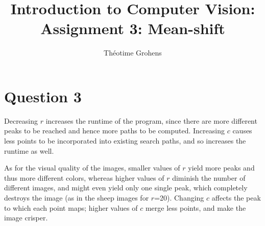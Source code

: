 \documentclass[a4paper]{article}
\author{Théotime Grohens}
\title{Introduction to Computer Vision: \\ Assignment 3: Mean-shift}
\begin{document}
\maketitle

\section*{Question 3}

Decreasing $r$ increases the runtime of the program, since there are more different peaks to be reached and hence more paths to be computed.
Increasing $c$ causes less points to be incorporated into existing search paths, and so increases the runtime as well.

As for the visual quality of the images, smaller values of $r$ yield more peaks and thus more different colors, whereas higher values of $r$ diminish the number of different images, and might even yield only one single peak, which completely destroys the image (as in the sheep images for $r$=20).
Changing $c$ affects the peak to which each point maps; higher values of $c$ merge less points, and make the image crisper.
\end{document}
